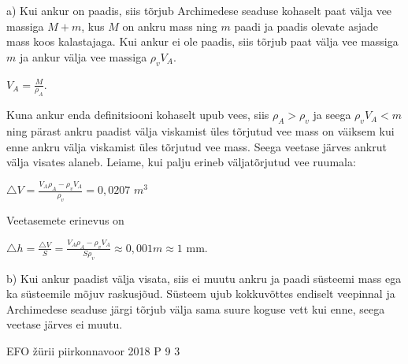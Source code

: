 \documentclass[11pt]{article}
\begin{document}
{{\ifSolution
a) Kui ankur on paadis, siis tõrjub Archimedese seaduse kohaselt paat välja vee massiga $M + m$, kus $M$ on ankru mass ning $m$ paadi ja paadis olevate asjade mass koos kalastajaga. Kui ankur ei ole paadis, siis tõrjub paat välja vee massiga $m$ ja ankur välja vee massiga $\rho_v V_A$.
\begin{center}
$V_A = \frac{M}{\rho_A}$.
\end{center}
Kuna ankur enda definitsiooni kohaselt upub vees, siis $\rho_A > \rho_v$ ja seega $\rho_v V_A < m$ ning pärast ankru paadist välja viskamist üles tõrjutud vee mass on väiksem kui enne ankru välja viskamist üles tõrjutud vee mass. Seega veetase järves ankrut välja visates alaneb. Leiame, kui palju erineb väljatõrjutud vee ruumala:
\begin{center}
$\triangle V =\frac{ V_A \rho_A - \rho_v V_A}{\rho_v} = 0,0207$ $m^3$ 
\end{center}
Veetasemete erinevus on
\begin{center}
$\triangle h = \frac{\triangle V}{S} = \frac{V_A \rho_A - \rho_v V_A}{S\rho_v} \approx 0,001 m \approx 1$ mm.
\end{center}
b) Kui ankur paadist välja visata, siis ei muutu ankru ja paadi süsteemi mass ega ka süsteemile mõjuv raskusjõud. Süsteem ujub kokkuvõttes endiselt veepinnal ja Archimedese seaduse järgi tõrjub välja sama suure koguse vett kui enne, seega veetase järves ei muutu.
\fi
}

{EFO žürii} %
{piirkonnavoor} %
{2018} %
{P 9} %
{3} %
{

}}
\end{document}
